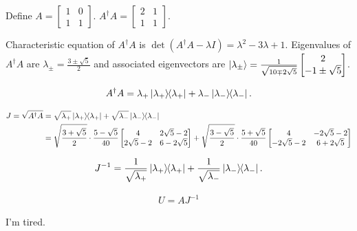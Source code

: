 
Define
$A = \begin{bmatrix}
1 & 0 \\ 
1 & 1
\end{bmatrix}$.
%
$A^\dagger A = \begin{bmatrix}
2 & 1 \\ 
1 & 1
\end{bmatrix}$.

 Characteristic equation of $A^\dagger A$ is $\det(A^\dagger A - \lambda I) = \lambda^2 - 3 \lambda + 1$.
 Eigenvalues of $A^\dagger A$ are $\lambda_\pm = \frac{3 \pm \sqrt{5}}{2}$
 and associated eigenvectors are $\ket{\lambda_\pm} = \frac{1}{\sqrt{10 \mp 2 \sqrt{5}}} \begin{bmatrix}
 2 \\ 
 -1 \pm \sqrt{5}
 \end{bmatrix} $.

\begin{align*}
	A^\dagger A = \lambda_+ \ket{\lambda_+}\hspace{-1mm} \bra{\lambda_+} + \lambda_- \ket{\lambda_-}\hspace{-1mm} \bra{\lambda_-}.
\end{align*}

 \begin{align*}
 	J = \sqrt{A^\dagger A} &= \sqrt{\lambda_+} \ket{\lambda_+}\hspace{-1mm} \bra{\lambda_+} + \sqrt{\lambda_-} \ket{\lambda_-}\hspace{-1mm} \bra{\lambda_-}\\
 		&= \sqrt{\frac{3 + \sqrt{5}}{2}} \cdot \frac{5 - \sqrt{5}}{40} \begin{bmatrix}
 		4 & 2\sqrt{5} -2 \\ 
 		2 \sqrt{5} - 2 & 6 -2\sqrt{5}
 		\end{bmatrix}
 		+
 		\sqrt{\frac{3 - \sqrt{5}}{2}} \cdot \frac{5 + \sqrt{5}}{40} \begin{bmatrix}
 		4 & -2\sqrt{5} -2 \\ 
 		-2 \sqrt{5} - 2 & 6 +2\sqrt{5}
 		\end{bmatrix}
 \end{align*}


\begin{align*}
	J^{-1} = \frac{1}{ \sqrt{\lambda_+} } \ket{\lambda_+}\hspace{-1mm} \bra{\lambda_+} + \frac{1}{ \sqrt{\lambda_-} } \ket{\lambda_-}\hspace{-1mm} \bra{\lambda_-}.
\end{align*}


\begin{align*}
	U = AJ^{-1}
\end{align*}

I'm tired.


